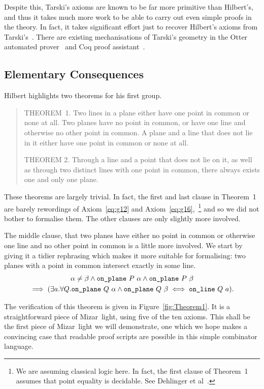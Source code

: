 Despite this, Tarski's axioms are known to be far more primitive than Hilbert's, and thus it takes much more work to be able to carry out even simple proofs in the theory. In fact, it takes significant effort just to recover Hilbert's axioms from Tarski's~\cite{NarbouxTarskiHilbert}. There are existing mechanisations of Tarski's geometry in the Otter automated prover~\cite{QuaifeTarski} and Coq proof assistant~\cite{NarbouxTarski}. 

\subsection{Elementary Consequences}
Hilbert highlights two theorems for his first group.

\begin{quotation}
  THEOREM~1. Two lines in a plane either have one point in common or none at all. Two planes have no point in common, or have one line and otherwise no other point in common. A plane and a line that does not lie in it either have one point in common or none at all.

  THEOREM 2. Through a line and a point that does not lie on it, as well as through two distinct lines with one point in common, there always exists one and only one plane.
\end{quotation}

These theorems are largely trivial. In fact, the first and last clause in Theorem~1 are barely rewordings of Axiom~\ref{eq:g12} and Axiom~\ref{eq:g16},~\footnote{We are assuming classical logic here. In fact, the first clause of Theorem~1 assumes that point equality is decidable. See Dehlinger et al~\cite{DehlingerFOG}.} and so we did not bother to formalise them. The other clauses are only slightly more involved. 

The middle clause, that two planes have either no point in common or otherwise one line and no other point in common is a little more involved. We start by giving it a tidier rephrasing which makes it more suitable for formalising: two planes with a point in common intersect exactly in some line.
\begin{multline}
  \alpha \neq \beta \wedge \texttt{on\_plane}\ P\ \alpha \wedge \texttt{on\_plane}\ P\ \beta\\
  \implies (\exists a. \forall Q. \texttt{on\_plane}\ Q\ \alpha \wedge \texttt{on\_plane}\ Q\ \beta \iff \texttt{on\_line}\ Q\ a).
\end{multline}

The verification of this theorem is given in Figure~\ref{fig:Theorem1}. It is a straightforward piece of Mizar~light, using five of the ten axioms. This shall be the first piece of Mizar~light we will demonstrate, one which we hope makes a convincing case that readable proof scripts are possible in this simple combinator language.


